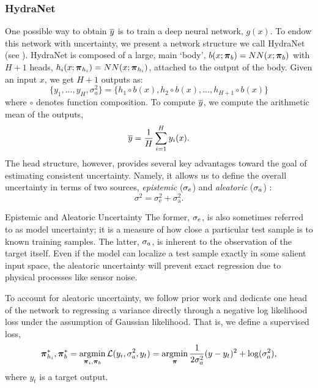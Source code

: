 \subsubsection{HydraNet}
One possible way to obtain $\overline{y}$ is to train a deep neural network, $g(x)$. To endow this network with uncertainty, we present a network structure we call HydraNet (see ). HydraNet is composed of a large, main `body', $b(x; \boldsymbol{\mathbf{\pi}}_b) = NN(x; \boldsymbol{\mathbf{\pi}}_b)$ with $H+1$ heads, $h_i(x; \boldsymbol{\mathbf{\pi}}_{h_i}) = NN(x; \boldsymbol{\mathbf{\pi}}_{h_i})$, attached to the output of the body. Given an input $x$, we get $H+1$ outputs as:
\begin{equation}
	\{y_1, ..., y_H, \sigma^2_a\} = \{h_1 \circ b (x), h_2 \circ b (x), ..., h_{H+1} \circ b (x)\}
\end{equation}
where $\circ$ denotes function composition. To compute  $\overline{y}$, we compute the arithmetic mean of the outputs,
\begin{equation}
\label{eq:hn_1d_mean}
\overline{y} = \frac{1}{H}\sum_{i=1}^{H}y_i(x).
\end{equation} 
The head structure, however, provides several key advantages toward the goal of estimating consistent uncertainty. Namely, it allows us to define the overall uncertainty in terms of two sources, \textit{epistemic} ($\sigma_e$) and \textit{aleatoric} ($\sigma_a$) \citep{Kendall2017-vs}:
\begin{equation}
\label{eq:1d_hydranet_uncertainty}
\sigma^2 = \sigma^2_{\text{e}} + \sigma^2_{\text{a}}.
\end{equation} 
\begin{remark}{Epistemic and Aleatoric Uncertainty}
	The former, $\sigma_e$, is also sometimes referred to as model uncertainty; it is a measure of how close a particular test sample is to known training samples. The latter, $\sigma_a$, is inherent to the observation of the target itself.  Even if the model can localize a test sample exactly in some salient input space, the aleatoric uncertainty will prevent exact regression due to physical processes like sensor noise.
\end{remark}

To account for aleatoric uncertainty, we follow prior work \citep{Haarnoja2016-ph,Lakshminarayanan2017} and dedicate one head of the network to regressing a variance directly through a negative log likelihood loss under the assumption of Gaussian likelihood. That is, we define a supervised loss,
\begin{equation}
\boldsymbol{\mathbf{\pi}}_{h_i}^*, \boldsymbol{\mathbf{\pi}}_b^* = \operatorname*{argmin}_{\boldsymbol{\mathbf{\pi}}_i, \boldsymbol{\mathbf{\pi}}_b} \mathcal{L}(y_i, \sigma_a^2, y_t) = \operatorname*{argmin}_{\boldsymbol{\mathbf{\pi}}} \frac{1}{2\sigma_a^2}(y-y_t)^2 	+ \log(\sigma_a^2),
\end{equation}
where $y_t$ is a target output.


